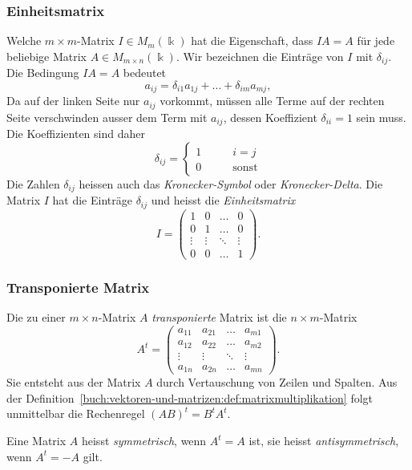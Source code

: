 \subsubsection{Einheitsmatrix}
Welche $m\times m$-Matrix $I\in M_{m}(\Bbbk)$ hat die Eigenschaft, dass
$IA=A$ für jede beliebige Matrix $A\in M_{m\times n}(\Bbbk)$.
Wir bezeichnen die Einträge von $I$ mit $\delta_{ij}$.
Die Bedingung $IA=A$ bedeutet
\[
a_{ij} = \delta_{i1}a_{1j} + \dots + \delta_{im}a_{mj},
\]
Da auf der linken Seite nur $a_{ij}$ vorkommt, müssen alle Terme auf der
rechten Seite verschwinden ausser dem Term mit $a_{ij}$, dessen
Koeffizient $\delta_{ii}=1$ sein muss.
Die Koeffizienten sind daher
\[
\delta_{ij}
=
\begin{cases}
1&\qquad i=j\\
0&\qquad\text{sonst}
\end{cases}
\]
Die Zahlen $\delta_{ij}$ heissen auch das {\em Kronecker-Symbol} oder
{\em Kronecker-Delta}.
%
%
Die Matrix $I$ hat die Einträge $\delta_{ij}$ und heisst die
{\em Einheitsmatrix}
%
\[
I
=
\begin{pmatrix}
1     &0     &\dots &0     \\
0     &1     &\dots &0     \\[-2pt]
\vdots&\vdots&\ddots&\vdots\\
0     &0     &\dots &1
\end{pmatrix}.
\]

\subsubsection{Transponierte Matrix}
%
%
Die zu einer $m\times n$-Matrix $A$ {\em transponierte} Matrix ist die
$n\times m$-Matrix
\[
A^t=\begin{pmatrix}
a_{11}&a_{21}&\dots&a_{m1}\\
a_{12}&a_{22}&\dots&a_{m2}\\
\vdots&\vdots&\ddots&\vdots\\
a_{1n}&a_{2n}&\dots&a_{mn}
\end{pmatrix}.
\]
Sie entsteht aus der Matrix $A$ durch Vertauschung von Zeilen und Spalten.
Aus der Definition~\ref{buch:vektoren-und-matrizen:def:matrixmultiplikation}
folgt unmittelbar die Rechenregel $(AB)^t = B^tA^t$.

Eine Matrix $A$ heisst {\em symmetrisch}, wenn $A^t=A$ ist, sie heisst
{\em antisymmetrisch}, wenn $A^t=-A$ gilt.
%
%
%
%
